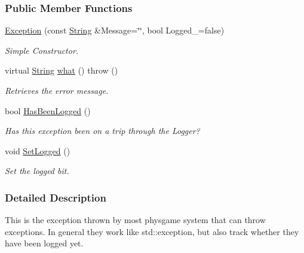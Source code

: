 \subsubsection*{Public Member Functions}
\begin{DoxyCompactItemize}
\item 
\hyperlink{classphys_1_1Exception_a274184178b7e7589bf1dcde1643924c1}{Exception} (const \hyperlink{namespacephys_aa03900411993de7fbfec4789bc1d392e}{String} \&Message=\char`\"{}\char`\"{}, bool Logged\_\-=false)
\begin{DoxyCompactList}\small\item\em Simple Constructor. \item\end{DoxyCompactList}\item 
virtual \hyperlink{namespacephys_aa03900411993de7fbfec4789bc1d392e}{String} \hyperlink{classphys_1_1Exception_ac929f9b3929526eec6e6b581c9a9dd73}{what} ()  throw ()
\begin{DoxyCompactList}\small\item\em Retrieves the error message. \item\end{DoxyCompactList}\item 
bool \hyperlink{classphys_1_1Exception_ab1399e25435c390db551855fda338951}{HasBeenLogged} ()
\begin{DoxyCompactList}\small\item\em Has this exception been on a trip through the Logger? \item\end{DoxyCompactList}\item 
\hypertarget{classphys_1_1Exception_a48ea61816b826d9b10dd43b76b6c7143}{
void \hyperlink{classphys_1_1Exception_a48ea61816b826d9b10dd43b76b6c7143}{SetLogged} ()}
\label{classphys_1_1Exception_a48ea61816b826d9b10dd43b76b6c7143}

\begin{DoxyCompactList}\small\item\em Set the logged bit. \item\end{DoxyCompactList}\end{DoxyCompactItemize}


\subsubsection{Detailed Description}
This is the exception thrown by most physgame system that can throw exceptions. In general they work like std::exception, but also track whether they have been logged yet. 

